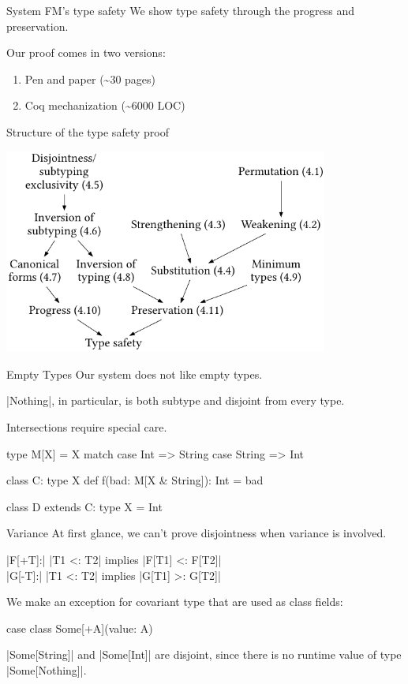 \documentclass[10pt]{beamer}
\newenvironment{slide}[2][]
  {\begin{frame}[fragile,environment=slide,#1]{#2}}
  {\end{frame}}
\begin{document}
\begin{slide}{System FM's type safety}
We show type safety through the progress and preservation.

Our proof comes in two versions:
\begin{enumerate}
  \item Pen and paper (\textasciitilde30 pages)
  \item Coq mechanization (\textasciitilde6000 LOC)
\end{enumerate}
\end{slide}

\begin{slide}{Structure of the type safety proof}
\begin{center}
\includegraphics[width=0.8\textwidth]{figures/FMProofStructure.pdf}
\end{center}
\end{slide}

\begin{slide}{Empty Types}
Our system does not like empty types.

|Nothing|, in particular, is both subtype and disjoint from every type.

Intersections require special care.

\pause

\begin{code}
type M[X] = X match
  case Int => String
  case String => Int

class C:
  type X
  def f(bad: M[X & String]): Int = bad

class D extends C:
  type X = Int
\end{code}
\end{slide}

\begin{slide}{Variance}
At first glance, we can't prove disjointness when variance is involved.

|F[+T]:| \quad |T1 <: T2| \quad implies \quad |F[T1] <: F[T2]|\\
|G[-T]:| \quad |T1 <: T2| \quad implies \quad |G[T1] >: G[T2]|
\pause

We make an exception for covariant type that are used as class fields:
\begin{code}
case class Some[+A](value: A)
\end{code}

|Some[String]| and |Some[Int]| are disjoint, since there is no runtime value of type |Some[Nothing]|.

\end{slide}
\end{document}
